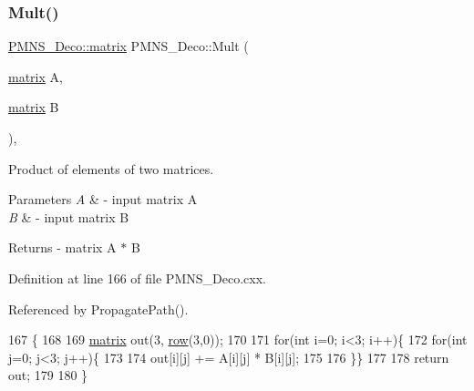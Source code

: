 \subsubsection{\texorpdfstring{Mult()}{Mult()}}
{\footnotesize\ttfamily \hyperlink{classOscProb_1_1PMNS__Deco_a77b4e0c041b6268910a270be0f5387c9}{P\+M\+N\+S\+\_\+\+Deco\+::matrix} P\+M\+N\+S\+\_\+\+Deco\+::\+Mult (\begin{DoxyParamCaption}\item[{\hyperlink{classOscProb_1_1PMNS__Deco_a77b4e0c041b6268910a270be0f5387c9}{matrix}}]{A,  }\item[{\hyperlink{classOscProb_1_1PMNS__Deco_a77b4e0c041b6268910a270be0f5387c9}{matrix}}]{B }\end{DoxyParamCaption})\hspace{0.3cm}{\ttfamily [protected]}, {\ttfamily [virtual]}}

Product of elements of two matrices.


\begin{DoxyParams}{Parameters}
{\em A} & -\/ input matrix A \\
\hline
{\em B} & -\/ input matrix B\\
\hline
\end{DoxyParams}
\begin{DoxyReturn}{Returns}
-\/ matrix A $\ast$ B 
\end{DoxyReturn}


Definition at line 166 of file P\+M\+N\+S\+\_\+\+Deco.\+cxx.



Referenced by Propagate\+Path().


\begin{DoxyCode}
167 \{
168 
169   \hyperlink{classOscProb_1_1PMNS__Deco_a77b4e0c041b6268910a270be0f5387c9}{matrix} out(3, \hyperlink{classOscProb_1_1PMNS__Deco_a34634741bc68bc1c524cf47f44e7f5b6}{row}(3,0));
170   
171   \textcolor{keywordflow}{for}(\textcolor{keywordtype}{int} i=0; i<3; i++)\{
172   \textcolor{keywordflow}{for}(\textcolor{keywordtype}{int} j=0; j<3; j++)\{
173   
174     out[i][j] += A[i][j] * B[i][j];
175 
176   \}\}
177   
178   \textcolor{keywordflow}{return} out;
179 
180 \}
\end{DoxyCode}
\mbox{\label{classOscProb_1_1PMNS__Deco_aa81f47ea36207b90a5feb9849060032d}} 
